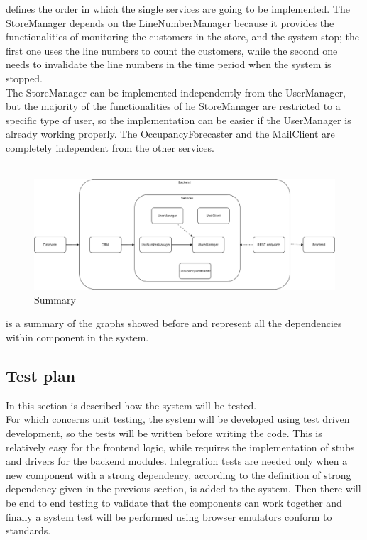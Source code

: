  defines the order in which the single services are going to be implemented.
The StoreManager depends on the LineNumberManager because it provides the functionalities of monitoring the customers in the store, and the
system stop;
the first one uses the line numbers to count the customers, while the second one needs to invalidate the line numbers
in the time period when the system is stopped.\\
The StoreManager can be implemented independently from the UserManager, but the majority of the functionalities of he StoreManager
are restricted to a specific type of user, so the implementation can be easier if the UserManager is already working properly.
The OccupancyForecaster and the MailClient are completely independent from the other services.\\
\\
\begin{figure}[H]
    \centering
    \includegraphics[height=0.4\textwidth]{Images/IntegrationAndTestingPlan/Summary.png}
    \caption{Summary}
    \label{fig:Summary}
\end{figure}
 is a summary of the graphs showed before and represent all the dependencies within component in the system.

\subsection{Test plan}
In this section is described how the system will be tested. \\
For which concerns unit testing, the system will be developed using test driven development, so the tests will be written before writing the code.
This is relatively easy for the frontend logic, while requires the implementation of stubs and drivers for the backend modules.
Integration tests are needed only when a new component with a strong dependency, according to the definition of strong dependency
given in the previous section, is added to the system.
Then there will be end to end testing to validate that the components can work together and finally a system test will be performed
using browser emulators conform to standards.
